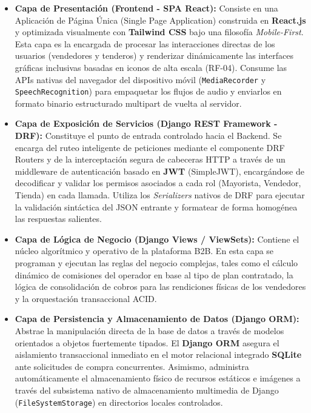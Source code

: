 \documentclass[12pt, a4paper]{article}
\begin{document}
\begin{itemize}
  \item \textbf{Capa de Presentación (Frontend - SPA React):} Consiste en una Aplicación de Página Única (Single Page Application) construida en \textbf{React.js} y optimizada visualmente con \textbf{Tailwind CSS} bajo una filosofía \textit{Mobile-First}. Esta capa es la encargada de procesar las interacciones directas de los usuarios (vendedores y tenderos) y renderizar dinámicamente las interfaces gráficas inclusivas basadas en iconos de alta escala (RF-04). Consume las APIs nativas del navegador del dispositivo móvil (\texttt{MediaRecorder} y \texttt{SpeechRecognition}) para empaquetar los flujos de audio y enviarlos en formato binario estructurado multipart de vuelta al servidor.

  \item \textbf{Capa de Exposición de Servicios (Django REST Framework - DRF):} Constituye el punto de entrada controlado hacia el Backend. Se encarga del ruteo inteligente de peticiones mediante el componente DRF Routers y de la interceptación segura de cabeceras HTTP a través de un middleware de autenticación basado en \textbf{JWT} (SimpleJWT), encargándose de decodificar y validar los permisos asociados a cada rol (Mayorista, Vendedor, Tienda) en cada llamada. Utiliza los \textit{Serializers} nativos de DRF para ejecutar la validación sintáctica del JSON entrante y formatear de forma homogénea las respuestas salientes.

  \item \textbf{Capa de Lógica de Negocio (Django Views / ViewSets):} Contiene el núcleo algorítmico y operativo de la plataforma B2B. En esta capa se programan y ejecutan las reglas del negocio complejas, tales como el cálculo dinámico de comisiones del operador en base al tipo de plan contratado, la lógica de consolidación de cobros para las rendiciones físicas de los vendedores y la orquestación transaccional ACID.

  \item \textbf{Capa de Persistencia y Almacenamiento de Datos (Django ORM):} Abstrae la manipulación directa de la base de datos a través de modelos orientados a objetos fuertemente tipados. El \textbf{Django ORM} asegura el aislamiento transaccional inmediato en el motor relacional integrado \textbf{SQLite} ante solicitudes de compra concurrentes. Asimismo, administra automáticamente el almacenamiento físico de recursos estáticos e imágenes a través del subsistema nativo de almacenamiento multimedia de Django (\texttt{FileSystemStorage}) en directorios locales controlados.
\end{itemize}
\end{document}
